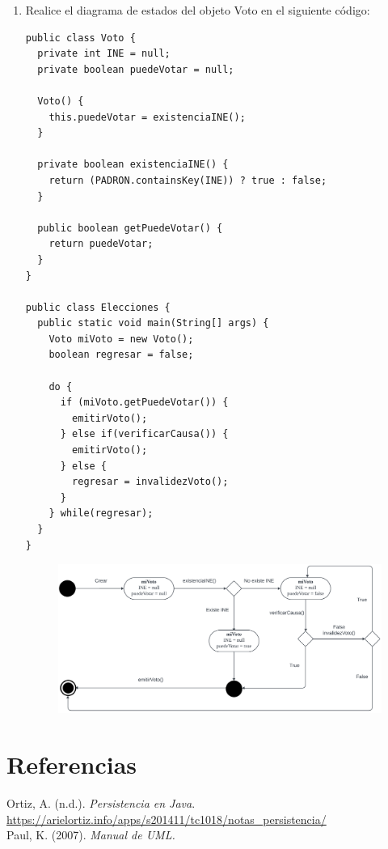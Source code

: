 \documentclass[12pt]{article}
\begin{document}
\begin{enumerate}
    \newpage
    \item Realice el diagrama de estados del objeto Voto en el siguiente código:
    \begin{lstlisting}
public class Voto {
  private int INE = null;
  private boolean puedeVotar = null;
  
  Voto() {
    this.puedeVotar = existenciaINE();
  }
  
  private boolean existenciaINE() {
    return (PADRON.containsKey(INE)) ? true : false;
  }

  public boolean getPuedeVotar() {
    return puedeVotar;
  }
}

public class Elecciones {
  public static void main(String[] args) {
    Voto miVoto = new Voto();
    boolean regresar = false;

    do {
      if (miVoto.getPuedeVotar()) {
        emitirVoto();
      } else if(verificarCausa()) {
        emitirVoto();
      } else {
        regresar = invalidezVoto();
      }
    } while(regresar);
  }
}
    \end{lstlisting}
    \begin{figure}[ht]
      \includegraphics[width = \textwidth, center]{estado.png}
    \end{figure}
  \end{enumerate}

  \section*{Referencias}
  Ortiz, A. (n.d.). \textit{Persistencia en Java}. \url{https://arielortiz.info/apps/s201411/tc1018/notas_persistencia/} \\

  Paul, K. (2007). \textit{Manual de UML.} 
\end{document}
